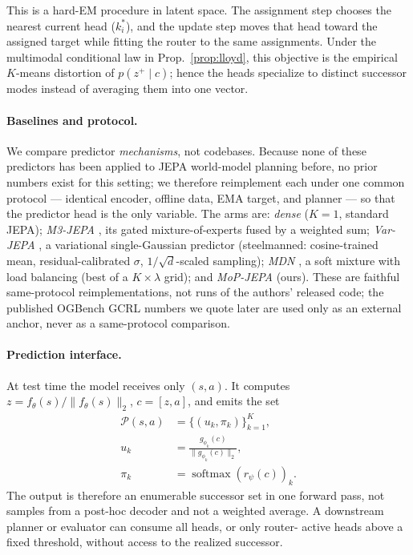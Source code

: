 \documentclass[letterpaper]{article}
\begin{document}
This is a hard-EM procedure in latent space. The assignment step chooses the nearest current head
($k_i^*$), and the update step moves that head toward the assigned target while fitting the router to the
same assignments. Under the multimodal conditional law in Prop.~\ref{prop:lloyd}, this objective is the
empirical $K$-means distortion of $p(z^+\mid c)$; hence the heads specialize to distinct successor modes
instead of averaging them into one vector.

\paragraph{Baselines and protocol.}
We compare predictor \emph{mechanisms}, not codebases. Because none of these predictors has been applied
to JEPA world-model planning before, no prior numbers exist for this setting; we therefore reimplement each
under one common protocol --- identical encoder, offline data, EMA target, and planner --- so that the
predictor head is the only variable. The arms are: \emph{dense} ($K{=}1$, standard JEPA);
\emph{M3-JEPA} \citep{lei2024m3jepa}, its gated mixture-of-experts fused by a weighted sum; \emph{Var-JEPA}
\citep{huang2026varjepa}, a variational single-Gaussian predictor (steelmanned: cosine-trained mean,
residual-calibrated $\sigma$, $1/\sqrt d$-scaled sampling); \emph{MDN} \citep{bishop1994mixture}, a soft
mixture with load balancing (best of a $K\times\lambda$ grid); and \emph{MoP-JEPA} (ours). These are
faithful same-protocol reimplementations, not runs of the authors' released code; the published
OGBench GCRL numbers we quote later are used only as an external anchor, never as a same-protocol
comparison.

\paragraph{Prediction interface.}
At test time the model receives only $(s,a)$. It computes $z=f_\theta(s)/\lVert f_\theta(s)\rVert_2$,
$c=[z,a]$, and emits the set
\begin{equation}
\begin{aligned}
\mathcal{P}(s,a)&=\{(u_k,\pi_k)\}_{k=1}^K,\\
u_k&=\frac{g_{\phi_k}(c)}{\lVert g_{\phi_k}(c)\rVert_2},\\
\pi_k&=\operatorname{softmax}(r_\psi(c))_k .
\end{aligned}
\end{equation}
The output is therefore an enumerable successor set in one forward pass, not samples from a post-hoc
decoder and not a weighted average. A downstream planner or evaluator can consume all heads, or only router-
active heads above a fixed threshold, without access to the realized successor.
\end{document}
